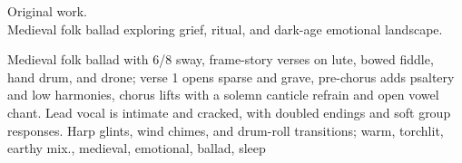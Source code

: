 

\begin{notes}
Original work.\\
Medieval folk ballad exploring grief, ritual, and dark-age emotional landscape.
\end{notes}

\begin{style}
Medieval folk ballad with 6/8 sway, frame-story verses on lute, bowed fiddle, hand drum, and drone; verse 1 opens sparse and grave, pre-chorus adds psaltery and low harmonies, chorus lifts with a solemn canticle refrain and open vowel chant. %
Lead vocal is intimate and cracked, with doubled endings and soft group responses. %
Harp glints, wind chimes, and drum-roll transitions; warm, torchlit, earthy mix., medieval, emotional, ballad, sleep
\end{style}

